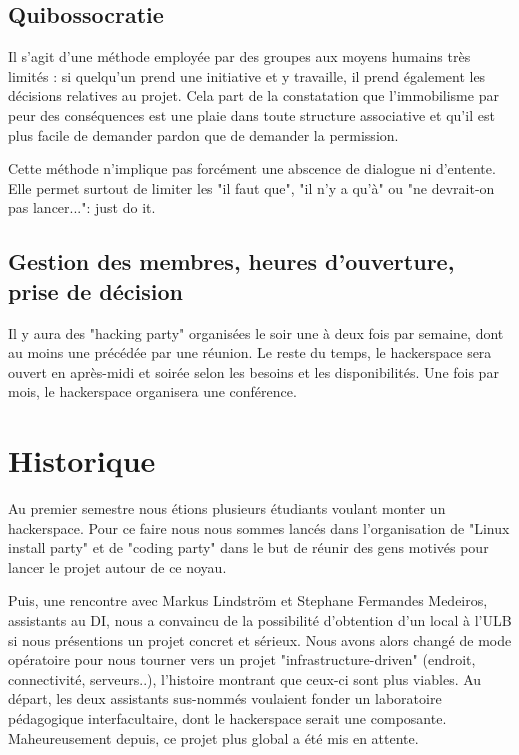 \documentclass{article}
\begin{document}
\subsection{Quibossocratie}

Il s'agit d'une méthode employée par des groupes aux moyens humains très limités : si quelqu'un prend 
une initiative et y travaille, il prend également les décisions relatives au projet. 
Cela part de la constatation que l'immobilisme par peur des conséquences est une 
plaie dans toute structure associative et qu'il est plus facile de demander pardon 
que de demander la permission.

Cette méthode n'implique pas forcément une abscence de dialogue ni d'entente. 
Elle permet surtout de limiter les "il faut que", "il n'y a qu'à" ou "ne devrait-on pas lancer...": just do it.

\subsection{Gestion des membres, heures d'ouverture, prise de décision}

Il y aura des "hacking party" organisées le soir une à deux fois par semaine, dont au moins
une précédée par une réunion.
Le reste du temps, le hackerspace sera ouvert en après-midi et soirée selon les 
besoins et les disponibilités.
Une fois par mois, le hackerspace organisera une conférence.

\newpage
\section{Historique}

Au premier semestre nous étions plusieurs étudiants voulant monter un hackerspace.
Pour ce faire nous nous sommes lancés dans l'organisation de "Linux install party" et
de "coding party" dans le but de réunir des gens motivés pour lancer le projet
autour de ce noyau.

Puis, une rencontre avec Markus Lindström et Stephane Fermandes Medeiros, assistants au DI, nous a convaincu de la possibilité d'obtention d'un local à l'ULB si nous présentions un projet concret et sérieux. Nous avons alors changé de mode
opératoire pour nous tourner vers un projet "infrastructure-driven" (endroit, connectivité, serveurs..),
l'histoire montrant que ceux-ci sont plus viables.  Au départ, les deux
assistants sus-nommés voulaient fonder un laboratoire pédagogique interfacultaire,
dont le hackerspace serait une composante. Maheureusement depuis, ce projet plus
global a été mis en attente.
\end{document}
